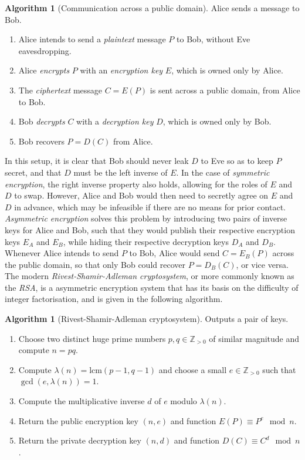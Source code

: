 \documentclass{article}
\newcommand{\Z}{\mathbb{Z}}
\newcommand{\rb}[1]{\left( #1 \right)}
\theoremstyle{definition}\newtheorem*{definition}{Definition}
\theoremstyle{definition}\newtheorem*{example}{Example}
\theoremstyle{definition}\newtheorem*{remark}{Remark}
\newtheorem{algorithm}[proposition]{Algorithm}
\begin{document}
\begin{algorithm}[Communication across a public domain]
Alice sends a message to Bob.
\begin{enumerate}
\item Alice intends to send a \emph{plaintext} message $ P $ to Bob, without Eve eavesdropping.
\item Alice \emph{encrypts} $ P $ with an \emph{encryption key} $ E $, which is owned only by Alice.
\item The \emph{ciphertext} message $ C = E\rb{P} $ is sent across a public domain, from Alice to Bob.
\item Bob \emph{decrypts} $ C $ with a \emph{decryption key} $ D $, which is owned only by Bob.
\item Bob recovers $ P = D\rb{C} $ from Alice.
\end{enumerate}
\end{algorithm}

In this setup, it is clear that Bob should never leak $ D $ to Eve so as to keep $ P $ secret, and that $ D $ must be the left inverse of $ E $. In the case of \emph{symmetric encryption}, the right inverse property also holds, allowing for the roles of $ E $ and $ D $ to swap. However, Alice and Bob would then need to secretly agree on $ E $ and $ D $ in advance, which may be infeasible if there are no means for prior contact. \emph{Asymmetric encryption} solves this problem by introducing two pairs of inverse keys for Alice and Bob, such that they would publish their respective encryption keys $ E_A $ and $ E_B $, while hiding their respective decryption keys $ D_A $ and $ D_B $. Whenever Alice intends to send $ P $ to Bob, Alice would send $ C = E_B\rb{P} $ across the public domain, so that only Bob could recover $ P = D_B\rb{C} $, or vice versa. The modern \emph{Rivest-Shamir-Adleman cryptosystem}, or more commonly known as the \emph{RSA}, is a asymmetric encryption system that has its basis on the difficulty of integer factorisation, and is given in the following algorithm.

\begin{algorithm}[Rivest-Shamir-Adleman cryptosystem]
Outputs a pair of keys.
\begin{enumerate}
\item Choose two distinct huge prime numbers $ p, q \in \Z_{> 0} $ of similar magnitude and compute $ n = pq $.
\item Compute $ \lambda\rb{n} = \text{lcm}\rb{p - 1, q - 1} $ and choose a small $ e \in \Z_{> 0} $ such that $ \gcd\rb{e, \lambda\rb{n}} = 1 $.
\item Compute the multiplicative inverse $ d $ of $ e $ modulo $ \lambda\rb{n} $.
\item Return the public encryption key $ \rb{n, e} $ and function $ E\rb{P} \equiv P^e \mod n $.
\item Return the private decryption key $ \rb{n, d} $ and function $ D\rb{C} \equiv C^d \mod n $.
\end{enumerate}
\end{algorithm}
\end{document}
